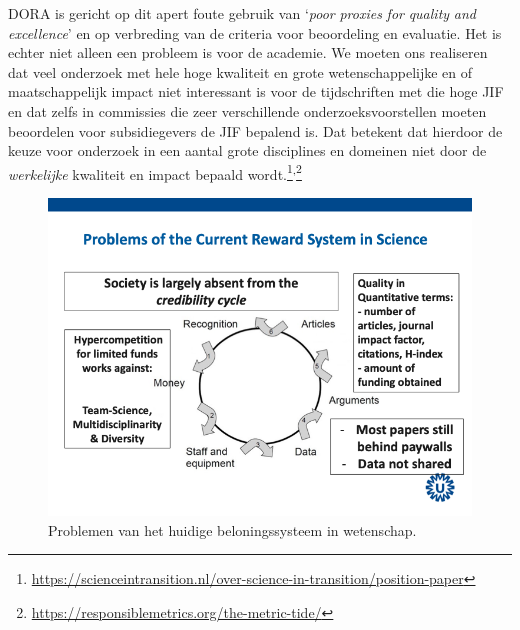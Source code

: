 \documentclass[smallauthor, chapterhaspagenum, nochapterinheader, pagenuminheader,  bigchapnum,medium2, tocpages, garamond, titleinheader]{jote-book}
\begin{document}
	DORA is gericht op dit apert foute gebruik van ‘\emph{poor}\emph{ }\emph{proxies}\emph{ }\emph{for}\emph{ }\emph{quality}\emph{ }\emph{and}\emph{ excellence}' en op verbreding van de criteria voor beoordeling en evaluatie. Het is echter niet alleen een probleem is voor de academie. We moeten ons realiseren dat veel onderzoek met hele hoge kwaliteit en grote wetenschappelijke en of maatschappelijk impact niet interessant is voor de tijdschriften met die hoge JIF en dat zelfs in commissies die zeer verschillende onderzoeksvoorstellen moeten beoordelen voor subsidiegevers de JIF bepalend is. Dat betekent dat hierdoor de keuze voor onderzoek in een aantal grote disciplines en domeinen niet door de \emph{werkelijke} kwaliteit en impact bepaald wordt.\footnote{\href{https://scienceintransition.nl/over-science-in-transition/position-paper}{https://scienceintransition.nl/over-science-in-transition/position-paper}}\textsuperscript{,}\footnote{\href{https://responsiblemetrics.org/the-metric-tide/}{https://responsiblemetrics.org/the-metric-tide/}}



	\begin{figure}
		\includegraphics[width=\linewidth]{media/image3.png}



		\label{fig:rId17}



		\caption{Problemen van het huidige beloningssysteem in wetenschap.}
	\end{figure}
\end{document}
